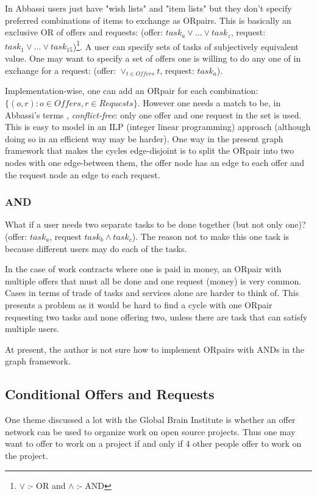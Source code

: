\documentclass[main.tex]{subfiles}
\begin{document}
In Abbassi \cite{Abb1} \cite{Abb2} users just have "wish lists" and "item lists" but they don't specify preferred combinations of items to exchange as ORpairs. This is basically an exclusive OR of offers and requests: (offer: $task_a \vee \dots \vee task_z$, request: $task_1 \vee \dots \vee task_15$)\footnote{$\vee$ :- OR and $\wedge$ :- AND}. A user can specify sets of tasks of subjectively equivalent value. One may want to specify a set of offers one is willing to do any one of in exchange for a request: (offer: $\vee_{t \in Offers} t$, request: $task_a$).

Implementation-wise, one can add an ORpair for each combination: $\{(o,r) : o \in Offers,r \in Requests\}$. However one needs a match to be, in Abbassi's terms \cite{Abb1}, \textit{conflict-free}: only one offer and one request in the set is used. This is easy to model in an ILP (integer linear programming) approach (although doing so in an efficient way may be harder). One way in the present graph framework that makes the cycles edge-disjoint is to split the ORpair into two nodes with one edge-between them, the offer node has an edge to each offer and the request node an edge to each request.

\subsubsection{AND}
What if a user needs two separate tasks to be done together (but not only one)? (offer: $task_a$, request $task_b \wedge task_c$). The reason not to make this one task is because different users may do each of the tasks.

In the case of work contracts where one is paid in money, an ORpair with multiple offers that must all be done and one request (money) is very common. Cases in terms of trade of tasks and services alone are harder to think of. This presents a problem as it would be hard to find a cycle with one ORpair requesting two tasks and none offering two, unless there are task that can satisfy multiple users.

At present, the author is not sure how to implement ORpairs with ANDs in the graph framework.

\subsection{Conditional Offers and Requests}
One theme discussed a lot with the Global Brain Institute is whether an offer network can be used to organize work on open source projects. Thus one may want to offer to work on a project if and only if 4 other people offer to work on the project.
\end{document}
